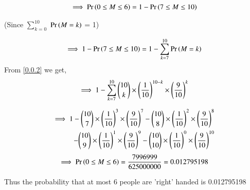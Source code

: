 \documentclass[journal,12pt,twocolumn]{IEEEtran}
\begin{document}
\begin{align}
    \implies \Pr\left(0\leq M \leq 6\right) = 1 - \Pr\left(7 \leq M \leq10\right)\label{0.0.3}
\end{align}
\begin{center}
    (Since $\sum_{k=0}^{10}$ $\Pr\left(M=k\right)$ = 1)\\
\end{center}
\begin{align}
    \implies 1 - \Pr\left(7 \leq M \leq 10\right) = 1 - \sum_{k=7}^{10} \Pr\left(M=k\right)\label{0.0.4}
\end{align}
From \eqref{0.0.2} we get,
\begin{align}
    \implies 1 - \sum_{k=7}^{10} {{10}\choose{k}} \times \left(\frac{1}{10}\right)^{10-k} \times \left(\frac{9}{10}\right)^{k}\label{0.0.5}
\end{align}

\begin{align}
    \begin{split}
        \implies 1 - {{10}\choose{7}} \times \brak{\frac{1}{10}}^{3} \times \brak{\frac{9}{10}}^{7} - {{10}\choose{8}} \times \brak{\frac{1}{10}}^{2} \times \brak{\frac{9}{10}}^{8}
        \bigskip\\
        -{{10}\choose{9}} \times \brak{\frac{1}{10}}^{1} \times \brak{\frac{9}{10}}^{9} - {{10}\choose{10}} \times \brak{\frac{1}{10}}^{0}\times
        \brak{\frac{9}{10}}^{10}\label{0.0.6}
    \end{split}
\end{align}
\begin{align}
    \implies \Pr\left(0 \leq M \leq 6\right) = \frac{7996999}{625000000} = 0.012795198\notag
\end{align}

\bigskip
Thus the probability that at most 6 people are 'right' handed is 0.012795198
\pagebreak
\end{document}
